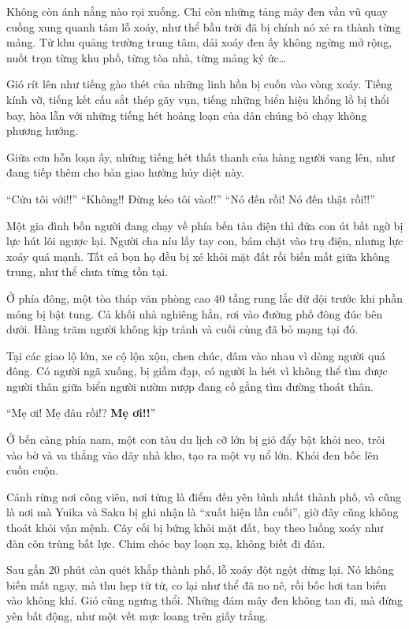 \documentclass[../main.tex]{subfiles}
\begin{document}
Không còn ánh nắng nào rọi xuống. Chỉ còn những tảng mây đen vần vũ quay cuồng xung quanh tâm lỗ xoáy, như thể bầu trời đã bị chính nó xé ra thành từng mảng. Từ khu quảng trường trung tâm, dải xoáy đen ấy không ngừng mở rộng, nuốt trọn từng khu phố, từng tòa nhà, từng mảng ký ức\dots

Gió rít lên như tiếng gào thét của những linh hồn bị cuốn vào vòng xoáy. Tiếng kính vỡ, tiếng kết cấu sắt thép gãy vụn, tiếng những biển hiệu khổng lồ bị thổi bay, hòa lẫn với những tiếng hét hoảng loạn của dân chúng bỏ chạy không phương hướng.

Giữa cơn hỗn loạn ấy, những tiếng hét thất thanh của hàng người vang lên, như đang tiếp thêm cho bản giao hưởng hủy diệt này.

``Cứu tôi với!!''
``Không!! Đừng kéo tôi vào!!''
``Nó đến rồi! Nó đến thật rồi!!''

Một gia đình bốn người đang chạy về phía bến tàu điện thì đứa con út bất ngờ bị lực hút lôi ngược lại. Người cha níu lấy tay con, bám chặt vào trụ điện, nhưng lực xoáy quá mạnh. Tất cả bọn họ đều bị xé khỏi mặt đất rồi biến mất giữa không trung, như thể chưa từng tồn tại.

Ở phía đông, một tòa tháp văn phòng cao 40 tầng rung lắc dữ dội trước khi phần móng bị bật tung. Cả khối nhà nghiêng hẳn, rơi vào đường phố đông đúc bên dưới. Hàng trăm người không kịp tránh và cuối cùng đã bỏ mạng tại đó.

Tại các giao lộ lớn, xe cộ lộn xộn, chen chúc, đâm vào nhau vì dòng người quá đông. Có người ngã xuống, bị giẫm đạp, có người la hét vì không thể tìm được người thân giữa biển người nườm nượp đang cố gắng tìm đường thoát thân.

``Mẹ ơi! Mẹ đâu rồi!? \textbf{Mẹ ơi!!}''

Ở bến cảng phía nam, một con tàu du lịch cỡ lớn bị gió đẩy bật khỏi neo, trôi vào bờ và va thẳng vào dãy nhà kho, tạo ra một vụ nổ lớn. Khói đen bốc lên cuồn cuộn.

Cánh rừng nơi công viên, nơi từng là điểm đến yên bình nhất thành phố, và cũng là nơi mà Yuika và Saku bị ghi nhận là ``xuất hiện lần cuối'', giờ đây cũng không thoát khỏi vận mệnh. Cây cối bị bứng khỏi mặt đất, bay theo luồng xoáy như đàn côn trùng bất lực. Chim chóc bay loạn xạ, không biết đi đâu.

Sau gần 20 phút càn quét khắp thành phố, lỗ xoáy đột ngột dừng lại. Nó không biến mất ngay, mà thu hẹp từ từ, co lại như thể đã no nê, rồi bốc hơi tan biến vào không khí. Gió cũng ngưng thổi. Những đám mây đen không tan đi, mà đứng yên bất động, như một vết mực loang trên giấy trắng.
\end{document}

